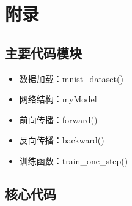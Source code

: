 \section{附录}

\subsection{主要代码模块}

\begin{itemize}
\item 数据加载：mnist\_dataset()
\item 网络结构：myModel
\item 前向传播：forward()
\item 反向传播：backward()
\item 训练函数：train\_one\_step()
\end{itemize}

\subsection{核心代码}

